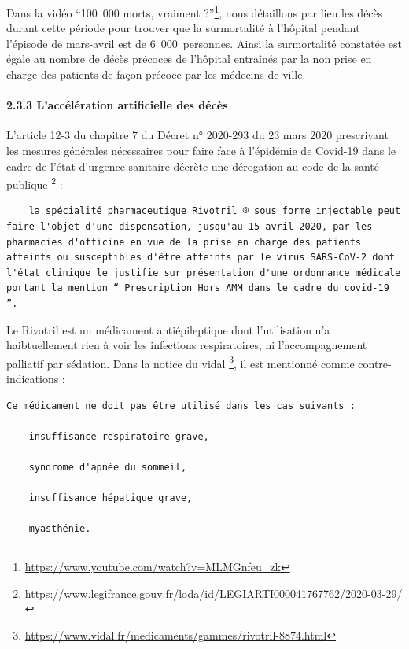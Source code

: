 \documentclass[
]{article}
\begin{document}
Dans la vidéo ``100~000 morts, vraiment ?''\footnote{\url{https://www.youtube.com/watch?v=MLMGnfeu_zk}},
nous détaillons par lieu les décès durant cette période pour trouver que
la surmortalité à l'hôpital pendant l'épisode de mars-avril est de
6~000~personnes. Ainsi la surmortalité constatée est égale au nombre de
décès précoces de l'hôpital entraînés par la non prise en charge des
patients de façon précoce par les médecins de ville.

\hypertarget{laccuxe9luxe9ration-artificielle-des-duxe9cuxe8s}{%
\paragraph{2.3.3 L'accélération artificielle des
décès}\label{laccuxe9luxe9ration-artificielle-des-duxe9cuxe8s}}

L'article 12-3 du chapitre 7 du Décret n° 2020-293 du 23 mars 2020
prescrivant les mesures générales nécessaires pour faire face à
l'épidémie de Covid-19 dans le cadre de l'état d'urgence sanitaire
décrète une dérogation au code de la santé publique \footnote{\url{https://www.legifrance.gouv.fr/loda/id/LEGIARTI000041767762/2020-03-29/}}
:

\begin{verbatim}
    la spécialité pharmaceutique Rivotril ® sous forme injectable peut faire l'objet d'une dispensation, jusqu'au 15 avril 2020, par les pharmacies d'officine en vue de la prise en charge des patients atteints ou susceptibles d'être atteints par le virus SARS-CoV-2 dont l'état clinique le justifie sur présentation d'une ordonnance médicale portant la mention “ Prescription Hors AMM dans le cadre du covid-19 ”.
\end{verbatim}

Le Rivotril est un médicament antiépileptique dont l'utilisation n'a
haibtuellement rien à voir les infections respiratoires, ni
l'accompagnement palliatif par sédation. Dans la notice du vidal
\footnote{\url{https://www.vidal.fr/medicaments/gammes/rivotril-8874.html}},
il est mentionné comme contre-indications :

\begin{verbatim}
Ce médicament ne doit pas être utilisé dans les cas suivants :

    insuffisance respiratoire grave,

    syndrome d'apnée du sommeil,

    insuffisance hépatique grave,

    myasthénie.
\end{verbatim}
\end{document}
